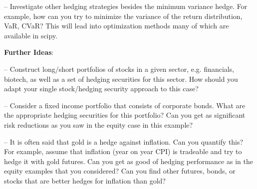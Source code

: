 \documentclass{amsart}
\begin{document}
-- Investigate other hedging strategies besides the minimum variance hedge.  
   For example, how can you try to minimize the variance of the 
   return distribution, VaR, CVaR?  This will lead into optimization methods 
   many of which are available in scipy.

\textbf{Further Ideas}:

-- Construct long/short portfolios of stocks in a given sector, e.g. financials, biotech, 
   as well as a set of hedging securities for this sector.  How should you adapt 
   your single stock/hedging security approach to this case? 

-- Consider a fixed income portfolio that consists of corporate bonds.  What are the 
   appropriate hedging securities for this portfolio? Can you get as significant risk 
   reductions as you saw in the equity case in this example? 

-- It is often said that gold is a hedge against inflation.  Can you quantify this? 
   For example, assume that inflation (year on year CPI) is tradeable and try to 
   hedge it with gold futures.  Can you get as good of hedging performance as in the 
   equity examples that you considered?  Can you find other futures, bonds, or stocks 
   that are better hedges for inflation than gold? 
\end{document}
